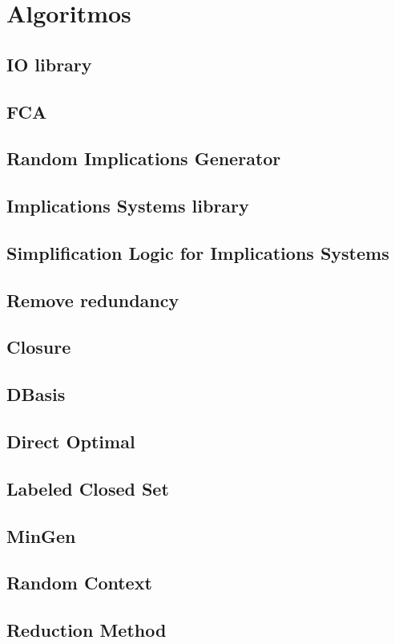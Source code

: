 \section{Algoritmos}
\subsection{IO library}



\subsection{FCA}


\subsection{Random Implications Generator}





\subsection{Implications Systems library}







\subsection{Simplification Logic for Implications Systems} %
\subsection{Remove redundancy}
\subsection{Closure}
\subsection{DBasis} %
\subsection{Direct Optimal} %
\subsection{Labeled Closed Set}
\subsection{MinGen}
\subsection{Random Context}
\subsection{Reduction Method} %


\newpage
\thispagestyle{empty}
\mbox{}

\newpage